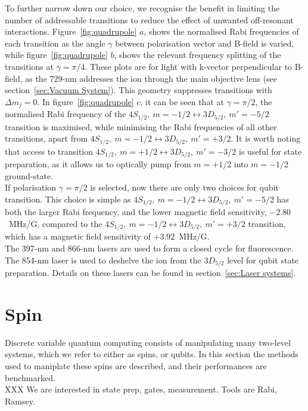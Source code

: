     To further narrow down our choice, we recognise the benefit in limiting the number of addressable transitions to reduce the effect of unwanted off-resonant interactions. Figure~\ref{fig:quadrupole} $a$, shows the normalised Rabi frequencies of each transition as the angle $\gamma$ between polarisation vector and B-field is varied, while figure~\ref{fig:quadrupole} $b$, shows the relevant frequency splitting of the transitions at $\gamma = \pi/4$. These plots are for light with k-vector perpendicular to B-field, as the 729-nm addresses the ion through the main objective lens (see section~\ref{sec:Vacuum System}). This geometry suppresses transitions with $\Delta m_j = 0$. In figure~\ref{fig:quadrupole} $c$, it can be seen that at $\gamma = \pi/2$, the normalised Rabi frequency of the
    $4S_{1/2},~m = -1/2 \leftrightarrow 3D_{5/2},~m' = -5/2$ transition is maximised, while
    minimising the Rabi frequencies of all other transitions, apart from
    $4S_{1/2},~m = -1/2 \leftrightarrow 3D_{5/2},~m' = +3/2$.
    It is worth noting that access to transition $4S_{1/2},~m = +1/2 \leftrightarrow 3D_{5/2},~m' = -3/2$ is useful for state preparation, as it allows us to optically pump from $m = +1/2$ into $m = -1/2$ ground-state. \\
    If polarisation $\gamma = \pi/2$ is selected, now there are only two choices for qubit transition. This choice is simple as $4S_{1/2},~m = -1/2 \leftrightarrow 3D_{5/2},~m' = -5/2$ has both the larger Rabi frequency, and the lower magnetic field sensitivity, $-2.80$~MHz/G, compared to the $4S_{1/2},~m = -1/2 \leftrightarrow 3D_{5/2},~m' = +3/2$ transition, which has a magnetic field sensitivity of $+3.92$~MHz/G.\\

    The 397-nm and 866-nm lasers are used to form a closed cycle for fluorescence. The 854-nm laser is used to deshelve the ion from the $3D_{5/2}$ level for qubit state preparation. Details on these lasers can be found in section~\ref{sec:Laser systems}.
    

\section{Spin}
\label{sec:Spin}
    Discrete variable quantum computing consists of manipulating many two-level
    systems, which we refer to either as spins, or qubits. In this section 
    the methods used to maniplate these spins are described, and their
    performances are benchmarked.\\
    XXX We are interested in state prep, gates, measurement.
    Tools are Rabi, Ramsey.

